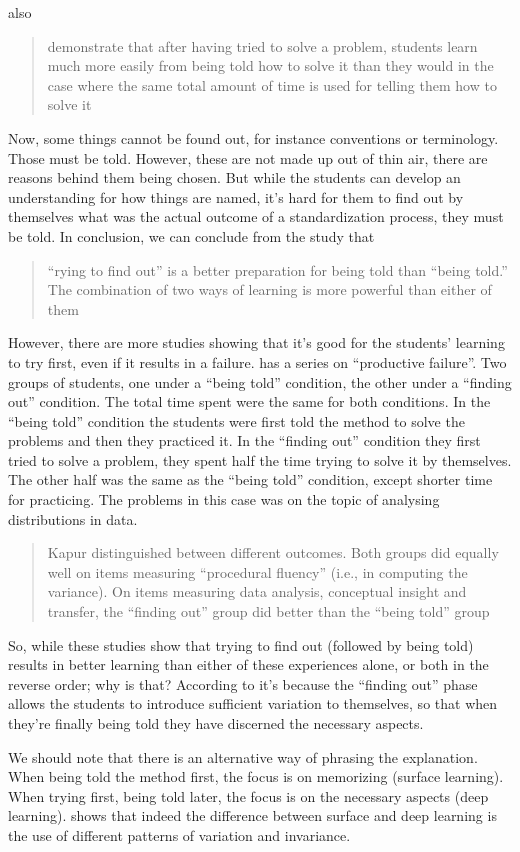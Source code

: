 \Textcite{BransfordSchwartz1999} also
\blockquote[{\cite[p.~217]{NecessaryConditionsOfLearning}}]{%
  demonstrate that after having tried to solve a problem, students 
  learn much more easily from being told how to solve it than they would in the 
  case where the same total amount of time is used for telling them how to 
  solve it%
}.
Now, some things cannot be found out, for instance conventions or terminology.
Those must be told.
However, these are not made up out of thin air, there are reasons behind them 
being chosen.
But while the students can develop an understanding for how things are named, 
it's hard for them to find out by themselves what was the actual outcome of a 
standardization process, they must be told.
In conclusion, we can conclude from the \textcite{BransfordSchwartz1999} study 
that \blockquote[{\cite[p.~218]{NecessaryConditionsOfLearning}}]{%
  \enquote{rying to find out} is a better preparation for being told 
  than \enquote{being told.} The combination of two ways of learning is more 
  powerful than either of them%
}.

However, there are more studies showing that it's good for the students' 
learning to try first, even if it results in a failure.
\Textcite{kapur2008productive,kapur2010productive,kapur2012productive} has a 
series on \enquote{productive failure}.
Two groups of students, one under a \enquote{being told} condition, the other 
under a \enquote{finding out} condition.
The total time spent were the same for both conditions.
In the \enquote{being told} condition the students were first told the method 
to solve the problems and then they practiced it.
In the \enquote{finding out} condition they first tried to solve a problem, 
they spent half the time trying to solve it by themselves.
The other half was the same as the \enquote{being told} condition, except 
shorter time for practicing.
The problems in this case was on the topic of analysing distributions in data.
\blockquote[{\cite[p.~219]{NecessaryConditionsOfLearning}}]{%
  Kapur distinguished between different outcomes. Both groups
  did equally well on items measuring \enquote{procedural fluency} (i.e., in 
  computing the variance). On items measuring data analysis, conceptual insight 
  and transfer, the \enquote{finding out} group did better than the 
  \enquote{being told} group
}.

So, while these studies show that trying to find out (followed by being told) 
results in better learning than either of these experiences alone, or both in 
the reverse order; why is that?
According to \textcite{NecessaryConditionsOfLearning} it's because the 
\enquote{finding out} phase allows the students to introduce sufficient 
variation to themselves, so that when they're finally being told they have 
discerned the necessary aspects.

We should note that there is an alternative way of phrasing the explanation.
When being told the method first, the focus is on memorizing (surface 
learning).
When trying first, being told later, the focus is on the necessary aspects 
(deep learning).
\Textcite[Ch.~5]{NecessaryConditionsOfLearning} shows that indeed the 
difference between surface and deep learning is the use of different patterns 
of variation and invariance.

